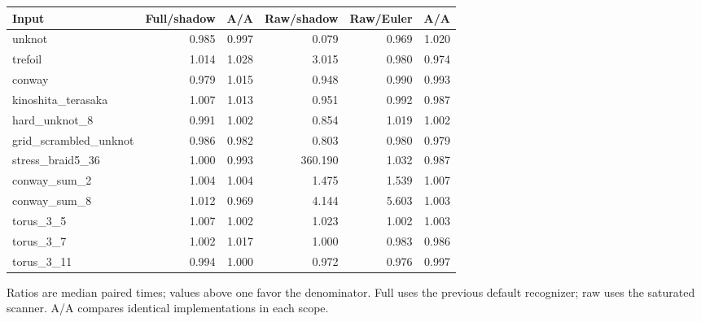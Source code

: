 \begin{center}\small
\begin{tabular}{@{}lrrrrr@{}}
\toprule
Input & Full/shadow & A/A & Raw/shadow & Raw/Euler & A/A \\
\midrule
unknot & 0.985 & 0.997 & 0.079 & 0.969 & 1.020 \\
trefoil & 1.014 & 1.028 & 3.015 & 0.980 & 0.974 \\
conway & 0.979 & 1.015 & 0.948 & 0.990 & 0.993 \\
kinoshita\_terasaka & 1.007 & 1.013 & 0.951 & 0.992 & 0.987 \\
hard\_unknot\_8 & 0.991 & 1.002 & 0.854 & 1.019 & 1.002 \\
grid\_scrambled\_unknot & 0.986 & 0.982 & 0.803 & 0.980 & 0.979 \\
stress\_braid5\_36 & 1.000 & 0.993 & 360.190 & 1.032 & 0.987 \\
conway\_sum\_2 & 1.004 & 1.004 & 1.475 & 1.539 & 1.007 \\
conway\_sum\_8 & 1.012 & 0.969 & 4.144 & 5.603 & 1.003 \\
torus\_3\_5 & 1.007 & 1.002 & 1.023 & 1.002 & 1.003 \\
torus\_3\_7 & 1.002 & 1.017 & 1.000 & 0.983 & 0.986 \\
torus\_3\_11 & 0.994 & 1.000 & 0.972 & 0.976 & 0.997 \\
\bottomrule
\end{tabular}
\end{center}
Ratios are median paired times; values above one favor the denominator. Full uses the previous default recognizer; raw uses the saturated scanner. A/A compares identical implementations in each scope.

